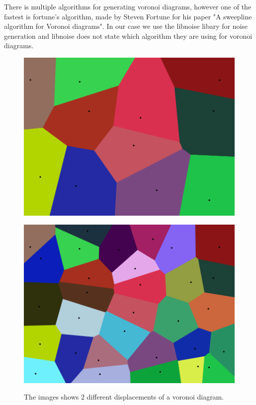 There is multiple algorithms for generating voronoi diagrams, however one of the fastest is fortune's algorithm, made by Steven Fortune for his paper "A sweepline algorithm for Voronoi diagrams"\cite{VoronoiSweepLine}. In our case we use the libnoise libary for noise generation and libnoise does not state which algorithm they are using for voronoi diagrams.

\begin{figure}[H]
	\begin{minipage}[b]{.48\linewidth}
		\includegraphics[width=0.95\linewidth]{img/VoronoiDiagramSmall}
		\label{fig:2a}
	\end{minipage}
	\begin{minipage}[b]{.48\linewidth}
		\includegraphics[width=0.95\linewidth]{img/VoronoiDiagramBig}
		\label{fig:2b}
	\end{minipage}
		\centering
		\caption{The images shows 2 different displacements of a voronoi diagram.}
		\label{fig:Voronoi}
\end{figure}

